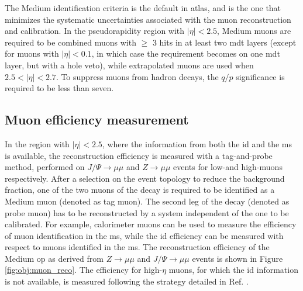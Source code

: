 The Medium identification criteria is the default in \gls{atlas}, and is the one that minimizes the systematic uncertainties associated with 
the muon reconstruction and calibration. In the pseudorapidity region with $|\eta|<2.5$, Medium muons are required to be combined muons with $\geq$ 3 hits in at least two \gls{mdt} layers (except for muons with $|\eta|<0.1$, in which case the requirement becomes on one \gls{mdt} layer, but with a hole veto), while extrapolated muons are used when $2.5<|\eta|<2.7$. To suppress muons from hadron decays, the $q/p$ significance is required to be less than seven. 

\subsection{Muon efficiency measurement}

In the region with $|\eta|<2.5$, where the information from both the \gls{id} and the \gls{ms} is available, 
the reconstruction efficiency is measured with a tag-and-probe method, performed on $J/\Psi \rightarrow \mu \mu$ and $Z\rightarrow \mu \mu$ events for low-\pt and high-\pt muons respectively. 
After a selection on the event topology to reduce the background fraction, one of the two muons of the decay is required to be identified 
as a Medium muon (denoted as tag muon). 
The second leg of the decay (denoted as probe muon) has to be reconstructed by a system independent of the one to be calibrated. For example, calorimeter muons can be used to measure the efficiency of muon identification in the \gls{ms}, while the \gls{id} efficiency can be measured with respect to muons identified in the \gls{ms}. 
The reconstruction efficiency of the Medium \gls{op} as derived from $Z\rightarrow \mu \mu$ and $J/\Psi \rightarrow \mu \mu$ events is shown in Figure \ref{fig:obj:muon_reco}.
The efficiency for high-$\eta$ muons, for which the \gls{id} information is not available, is measured following the strategy detailed in Ref. \cite{Aad:2014rra}.

